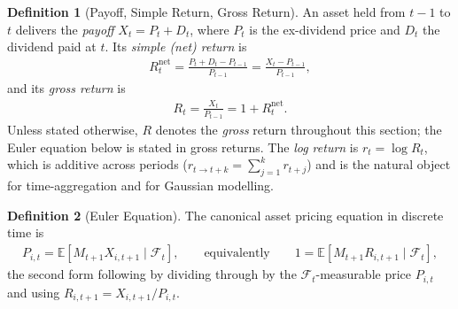 \documentclass[11pt]{article}
\theoremstyle{definition}
\newtheorem{definition}{Definition}[section]
\theoremstyle{plain}
\theoremstyle{remark}
\begin{document}
\begin{definition}[Payoff, Simple Return, Gross Return]
    An asset held from $t-1$ to $t$ delivers the \textit{payoff} $X_t = P_t + D_t$, where $P_t$ is the ex-dividend price and $D_t$ the dividend paid at $t$. Its \textit{simple (net) return} is
    \begin{align}
        R^{\mathrm{net}}_t = \frac{P_t + D_t - P_{t-1}}{P_{t-1}} = \frac{X_t - P_{t-1}}{P_{t-1}},
    \end{align}
    and its \textit{gross return} is
    \begin{align}
        R_t = \frac{X_t}{P_{t-1}} = 1 + R^{\mathrm{net}}_t.
    \end{align}
    Unless stated otherwise, $R$ denotes the \emph{gross} return throughout this section; the Euler equation below is stated in gross returns. The \textit{log return} is $r_t = \log R_t$, which is additive across periods ($r_{t\to t+k} = \sum_{j=1}^k r_{t+j}$) and is the natural object for time-aggregation and for Gaussian modelling.
\end{definition}

\begin{definition}[Euler Equation]
    The canonical asset pricing equation in discrete time is
    \begin{align}
        P_{i,t} = \mathbb{E}\!\left[M_{t+1} X_{i,t+1} \mid \mathcal{F}_t\right],
        \qquad\text{equivalently}\qquad
        1 = \mathbb{E}\!\left[M_{t+1} R_{i,t+1} \mid \mathcal{F}_t\right],
    \end{align}
    the second form following by dividing through by the $\mathcal{F}_t$-measurable price $P_{i,t}$ and using $R_{i,t+1} = X_{i,t+1}/P_{i,t}$.
\end{definition}
\end{document}
